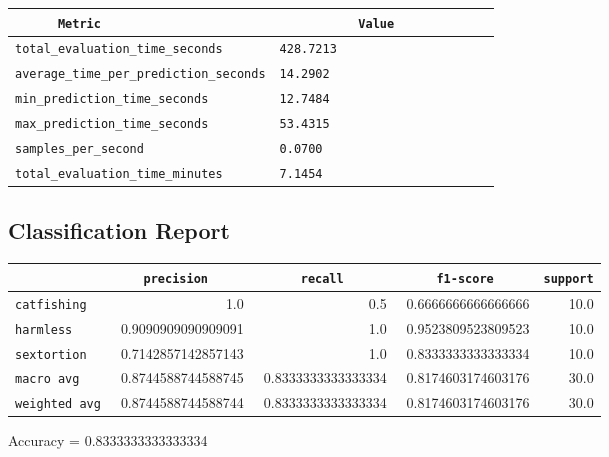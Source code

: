\documentclass{article}
\begin{document}
\begin{center}
\begin{tabular}{l | l} \hline
    \verb|      Metric     | & \verb|           Value           | \\ \hline
    \hline
    \verb|total_evaluation_time_seconds| & \verb|428.7213                     | \\ \hline
    \verb|average_time_per_prediction_seconds| & \verb|14.2902                      | \\ \hline
    \verb|min_prediction_time_seconds| & \verb|12.7484                      | \\ \hline
    \verb|max_prediction_time_seconds| & \verb|53.4315                      | \\ \hline
    \verb|samples_per_second| & \verb|0.0700                       | \\ \hline
    \verb|total_evaluation_time_minutes| & \verb|7.1454                       | \\ \hline
\end{tabular}
\end{center}

\subsection{Classification Report}

\begin{center}
\begin{tabular}{l | r | r | r | r} \hline
    \verb|            | & \verb|    precision     | & \verb|      recall      | & \verb|     f1-score     | & \verb|support| \\ \hline
    \hline
    \verb|catfishing | & 1.0 & 0.5 & 0.6666666666666666 &    10.0 \\ \hline
    \verb|harmless   | & 0.9090909090909091 & 1.0 & 0.9523809523809523 &    10.0 \\ \hline
    \verb|sextortion | & 0.7142857142857143 & 1.0 & 0.8333333333333334 &    10.0 \\ \hline
    \verb|macro avg  | & 0.8744588744588745 & 0.8333333333333334 & 0.8174603174603176 &    30.0 \\ \hline
    \verb|weighted avg| & 0.8744588744588744 & 0.8333333333333334 & 0.8174603174603176 &    30.0 \\ \hline
\end{tabular}
\end{center}

\begin{center}
Accuracy = 0.8333333333333334
\end{center}
\end{document}

